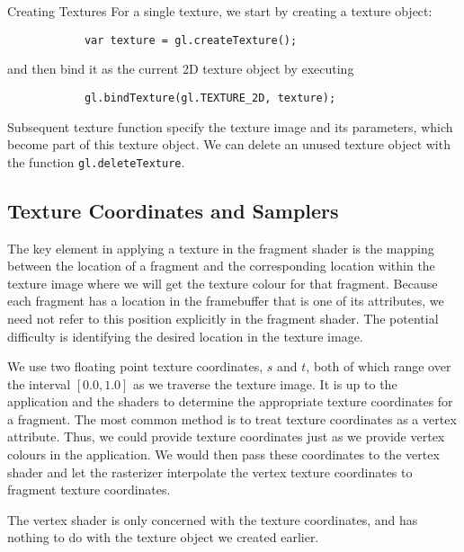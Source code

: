 \documentclass[../COS3712_Notes.tex]{subfiles}
\begin{document}
        \begin{sidenote}{Creating Textures}
          For a single texture, we start by creating a texture object:
          \begin{verbatim}
            var texture = gl.createTexture();
          \end{verbatim}
          and then bind it as the current 2D texture object by executing
          \begin{verbatim}
            gl.bindTexture(gl.TEXTURE_2D, texture);
          \end{verbatim}
          Subsequent texture function specify the texture image and its parameters,
          which become part of this texture object.
          We can delete an unused texture object with the function
          \texttt{gl.deleteTexture}.
        \end{sidenote}

      \subsection{Texture Coordinates and Samplers}
        The key element in applying a texture in the fragment shader is the mapping
        between the location of a fragment and the corresponding location within the texture image
        where we will get the texture colour for that fragment.
        Because each fragment has a location in the framebuffer that is one of its attributes,
        we need not refer to this position explicitly in the fragment shader.
        The potential difficulty is identifying the desired location in the texture image.

        We use two floating point texture coordinates, $s$ and $t$,
        both of which range over the interval $[0.0, 1.0]$ as we traverse the texture image.
        It is up to the application and the shaders to determine the appropriate texture
        coordinates for a fragment.
        The most common method is to treat texture coordinates as a vertex attribute.
        Thus, we could provide texture coordinates just as we provide vertex colours
        in the application.
        We would then pass these coordinates to the vertex shader and let the rasterizer
        interpolate the vertex texture coordinates to fragment texture coordinates.

        The vertex shader is only concerned with the texture coordinates,
        and has nothing to do with the texture object we created earlier.
\end{document}
